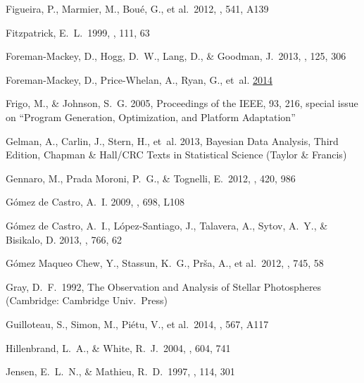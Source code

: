 \documentclass{aastex6}
\begin{document}
\begin{thebibliography}{}
 Figueira, P., Marmier, M., Bou{\'e}, G., et al.\ 2012, \aap, 541, A139

 Fitzpatrick, E.~L.\ 1999,
\pasp, 111, 63

 Foreman-Mackey, D., Hogg, D.~W., Lang, D., \& Goodman, J.\ 2013, \pasp, 125, 306

Foreman-Mackey, D., Price-Whelan, A., Ryan, G., {et~al.}
  \href{http://dx.doi.org/10.5281/zenodo.10598}{2014}

Frigo, M., \& Johnson, S.~G. 2005, Proceedings of the IEEE, 93,
  216, special issue on ``Program Generation, Optimization, and Platform
  Adaptation''

Gelman, A., Carlin, J., Stern, H., {et~al.} 2013, {Bayesian Data Analysis,
  Third Edition}, {Chapman \& Hall/CRC Texts in Statistical Science} (Taylor \&
  Francis)

 Gennaro, M., Prada Moroni, P.~G., \& Tognelli, E.\ 2012, \mnras, 420, 986

 G{\'o}mez de Castro, A.~I. 2009, \apj, 698, L108

 G{\'o}mez de Castro, A.~I., L{\'o}pez-Santiago, J., Talavera, A., Sytov, A.~Y., \& Bisikalo, D. 2013, \apj, 766, 62

 G{\'o}mez
Maqueo Chew, Y., Stassun, K.~G., Pr{\v s}a, A., et al.\ 2012, \apj, 745, 58

 Gray, D.~F.\ 1992, The Observation and Analysis of Stellar Photospheres (Cambridge: Cambridge Univ.~Press)

 Guilloteau, S., Simon, M., Pi{\'e}tu, V., et al.\ 2014, \aap, 567, A117

 Hillenbrand, L.~A., \& White, R.~J.\ 2004, \apj, 604, 741

 Jensen, E.~L.~N., \& Mathieu, R.~D.\ 1997, \aj, 114, 301


\end{thebibliography}
\end{document}
